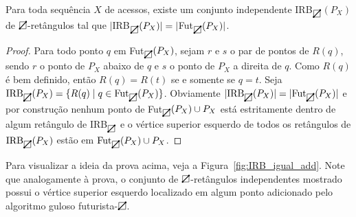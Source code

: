 \begin{lemma} \label{lema_6.1}
    Para toda sequência $X$ de acessos, existe um conjunto independente IRB$_{\rectpos}$$(P_X)$ de $\rectpos$-retângulos tal que $|$IRB$_{\rectpos}(P_X)| = |$Fut$_{\rectpos}(P_X)|$.
\end{lemma}

\begin{proof}
    Para todo ponto $q$ em Fut$_{\rectpos}(P_X)$, sejam $r$ e $s$ o par de pontos de $R(q)$, sendo $r$ o ponto de $P_X$ abaixo de $q$ e $s$ o ponto de $P_X$ a direita de $q$. Como $R(q)$ é bem definido, então $R(q) = R(t)$ se e somente se $q = t$. Seja \( \text{IRB}_{\rectpos}(P_X) = \{ R(q) \mid q \in \text{Fut}_{\rectpos}(P_X) \} \). Obviamente $|\text{IRB}_{\rectpos}(P_X)| = |\text{Fut}_{\rectpos}(P_X)|$ e por construção nenhum ponto de Fut$_{\rectpos}(P_X) \cup P_X$ está estritamente dentro de algum retângulo de IRB$_{\rectpos}$ e o vértice superior esquerdo de todos os retângulos de $\text{IRB}_{\rectpos}(P_X)$ estão em $\text{Fut}_{\rectpos}(P_X) \cup P_X$.
\end{proof}

Para visualizar a ideia da prova acima, veja a Figura~\ref{fig:IRB_igual_add}. Note que analogamente à prova, o conjunto de $\rectpos$-retângulos independentes mostrado possui o vértice superior esquerdo localizado em algum ponto adicionado pelo algoritmo guloso futurista-$\rectpos$. 

